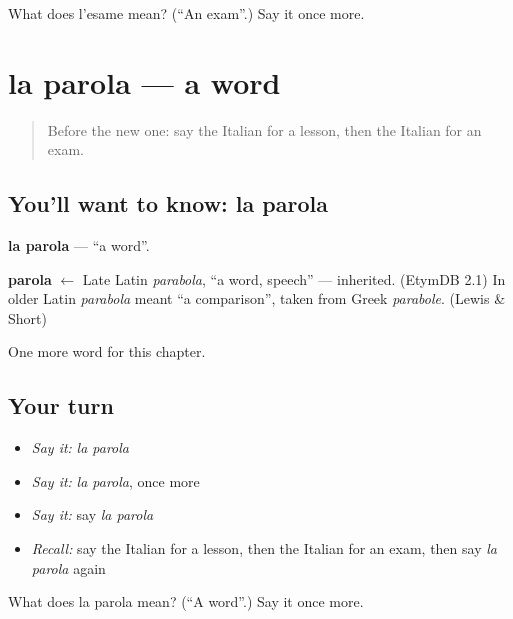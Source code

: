 \begin{tcolorbox}[breakable,colback=teal!4,colframe=teal!35!black,title={Before you move on}]
What does l'esame mean? (\textquotedblleft{}An exam\textquotedblright{}.) Say it once more.
\end{tcolorbox}
\section[la parola]{la parola — a word}

\label{lesson:IT-C114-parola}



\begin{quote}
Before the new one: say the Italian for a lesson, then the Italian for an exam.
\end{quote}

\subsection*{You'll want to know: la parola}
\textbf{la parola} — \textquotedblleft{}a word\textquotedblright{}.

\begin{cousinweb}
\textbf{parola} $\leftarrow$ Late Latin \emph{parabola}, \textquotedblleft{}a word, speech\textquotedblright{} — inherited. (EtymDB 2.1) In older Latin \emph{parabola} meant \textquotedblleft{}a comparison\textquotedblright{}, taken from Greek \emph{parabole}. (Lewis \& Short)
\end{cousinweb}

\begin{grammarlens}[title={What you've built}]
One more word for this chapter.
\end{grammarlens}

\subsection*{Your turn}
\begin{itemize}
\raggedright
  \item \emph{Say it:} \emph{la parola}
  \item \emph{Say it:} \emph{la parola}, once more
  \item \emph{Say it:} say \emph{la parola}
  \item \emph{Recall:} say the Italian for a lesson, then the Italian for an exam, then say \emph{la parola} again
\end{itemize}

\begin{tcolorbox}[breakable,colback=teal!4,colframe=teal!35!black,title={Before you move on}]
What does la parola mean? (\textquotedblleft{}A word\textquotedblright{}.) Say it once more.
\end{tcolorbox}
